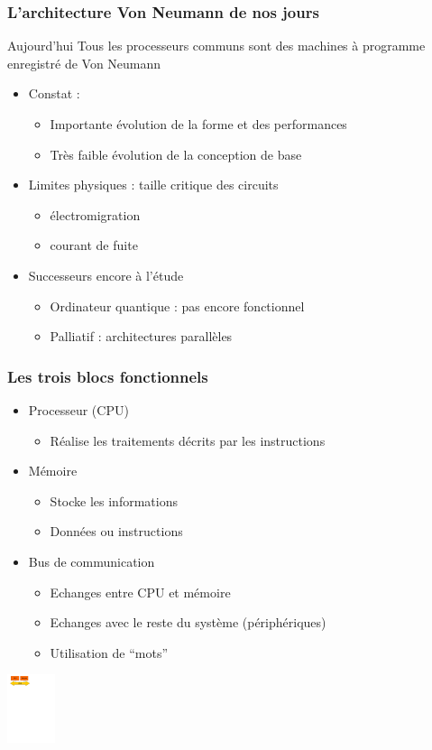 \begin{frame}
\frametitle{L'architecture Von Neumann de nos jours}
\begin{block}{Aujourd'hui}
Tous les processeurs communs sont des machines à programme enregistré de Von Neumann
\end{block}

\begin{itemize}
\item <1-> Constat :
\begin{itemize}
\item Importante évolution de la forme et des performances
\item Très faible évolution de la conception de base
\end{itemize}
\item <2-> Limites physiques : taille critique des circuits
\begin{itemize}
\item électromigration
\item courant de fuite
\end{itemize}
\item <3-> Successeurs encore à l'étude
\begin{itemize}
\item Ordinateur quantique : pas encore fonctionnel
\item Palliatif : architectures parallèles
\end{itemize}
\end{itemize}
\end{frame}


\begin{frame}
\frametitle{Les trois blocs fonctionnels}
\begin{itemize}
\item Processeur (CPU)
\begin{itemize}
\item Réalise les traitements décrits par les instructions
\end{itemize}
\item Mémoire
\begin{itemize}
\item Stocke les informations
\item Données ou instructions
\end{itemize}
\item Bus de communication
\begin{itemize}
\item Echanges entre CPU et mémoire
\item Echanges avec le reste du système (périphériques)
\item Utilisation de “mots”
\end{itemize}
\end{itemize}
\includegraphics[height=2cm]{../illustration/vn_cpu_mem_bus.pdf}
\end{frame}


